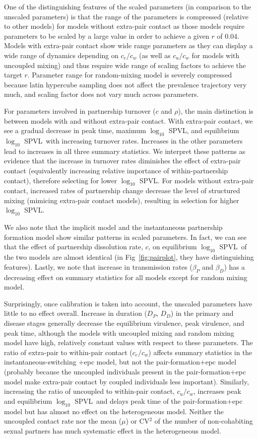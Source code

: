 \documentclass[10pt,letterpaper]{article}
\renewcommand{\figurename}{Fig}
\newcommand{\Lspvl}{$\log_{10}$ SPVL}
\begin{document}
One of the distinguishing features of the scaled parameters (in comparison to the unscaled parameters) is that the range of the parameters is compressed (relative to other models) for models without extra-pair contact as those models require parameters to be scaled by a large value in order to achieve a given $r$ of 0.04.
Models with extra-pair contact show wide range parameters as they can display a wide range of dynamics depending on $c_e/c_w$ (as well as $c_u/c_w$ for models with uncoupled mixing) and thus require wide range of scaling factors to achieve the target $r$.
Parameter range for random-mixing model is severely compressed because latin hypercube sampling does not affect the prevalence trajectory very much, and scaling factor does not vary much across parameters.

For parameters involved in partnership turnover ($c$ and $\rho$), the main distinction is between models with and without extra-pair contact. With extra-pair contact, we see a gradual decrease in peak time, maximum \Lspvl, and equilibrium \Lspvl\ with increasing turnover rates.
Increases in the other parameters lead to increases in all
three summary statistics.
We interpret these patterns as evidence
that the increase in turnover rates diminishes the effect of extra-pair contact (equivalently increasing relative importance of within-partnership contact), therefore selecting for lower \Lspvl.
For models without extra-pair contact, increased rates of partnership change decrease the level of structured mixing (mimicing extra-pair contact models), resulting in selection for higher \Lspvl.

We also note that the implicit model and the instantaneous partnership formation model show similar patterns in scaled parameters. In fact, we can see that the effect of partnership dissolution rate, $c$, on equilibrium \Lspvl\ of the two models are almost identical (in \figurename~\ref{fig:pairplot}, they have distinguishing features).
Lastly, we note that increase in transmission rates ($\beta_P$ and $\beta_D$) has a decreasing effect on summary statistics for all models except for random mixing model.

Surprisingly, once calibration
is taken into account, the unscaled parameters have little to no effect overall.
Increase in duration ($D_P$, $D_D$) in the primary and disease stages generally decrease the equilibrium virulence, peak virulence, and peak time,
although the models with uncoupled mixing and random mixing model have high, relatively
constant values with respect to these parameters.
The ratio of extra-pair to within-pair contact ($c_e/c_w$) affects
summary statistics in the instantaneous-switching +epc model, but not the pair-formation+epc
model (probably because the uncoupled individuals present in the pair-formation+epc
model make extra-pair contact by coupled individuals less important).
Similarly, increasing the ratio of uncoupled to within-pair contact, $c_u/c_w$, increases peak and equilibrium \Lspvl\ and delays peak time of the pair-formation+epc model but has almost no effect on the heterogeneous model.
Neither the uncoupled contact rate nor
the mean ($\mu$) or CV$^2$ of the number of non-cohabiting sexual
partners has much systematic effect in the heterogeneous model.
\end{document}
